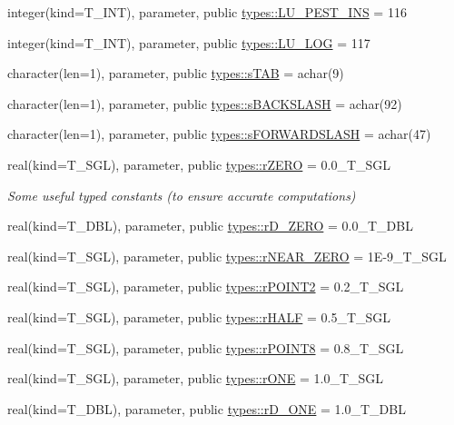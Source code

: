 \begin{DoxyCompactItemize}
\item 
integer(kind=T\_\-INT), parameter, public \hyperlink{namespacetypes_a8897682c60c1fbc7595e60937266dfc3}{types::LU\_\-PEST\_\-INS} = 116
\item 
integer(kind=T\_\-INT), parameter, public \hyperlink{namespacetypes_a6b30bc5adf5ad8e9498b0a9081078fe5}{types::LU\_\-LOG} = 117
\item 
character(len=1), parameter, public \hyperlink{namespacetypes_a1aba85f347398a7d96a17c88c664c7a1}{types::sTAB} = achar(9)
\item 
character(len=1), parameter, public \hyperlink{namespacetypes_a7ac07dde59c21f645da2f523cc34afe1}{types::sBACKSLASH} = achar(92)
\item 
character(len=1), parameter, public \hyperlink{namespacetypes_a75630efc0939bd3b2b2c5913d58c55f4}{types::sFORWARDSLASH} = achar(47)
\item 
real(kind=T\_\-SGL), parameter, public \hyperlink{namespacetypes_accfc31d1cd5f1a46b3fb99e6d1975a6b}{types::rZERO} = 0.0\_\-T\_\-SGL
\begin{DoxyCompactList}\small\item\em Some useful typed constants (to ensure accurate computations) \item\end{DoxyCompactList}\item 
real(kind=T\_\-DBL), parameter, public \hyperlink{namespacetypes_af4d6e7a6f7dfdf6df6fa94bcd6af757f}{types::rD\_\-ZERO} = 0.0\_\-T\_\-DBL
\item 
real(kind=T\_\-SGL), parameter, public \hyperlink{namespacetypes_a50c1fa61c229766c2a17cb7687703cdb}{types::rNEAR\_\-ZERO} = 1E-\/9\_\-T\_\-SGL
\item 
real(kind=T\_\-SGL), parameter, public \hyperlink{namespacetypes_af161d4f0ffc44961986c81a32a2c82a7}{types::rPOINT2} = 0.2\_\-T\_\-SGL
\item 
real(kind=T\_\-SGL), parameter, public \hyperlink{namespacetypes_a496f566e809e4eaac5c2d3b6138667d1}{types::rHALF} = 0.5\_\-T\_\-SGL
\item 
real(kind=T\_\-SGL), parameter, public \hyperlink{namespacetypes_a3d2ba56f06a1f0b74066c51ebcfe3454}{types::rPOINT8} = 0.8\_\-T\_\-SGL
\item 
real(kind=T\_\-SGL), parameter, public \hyperlink{namespacetypes_a94afcebb08a1e89087d5ffb5a7585b72}{types::rONE} = 1.0\_\-T\_\-SGL
\item 
real(kind=T\_\-DBL), parameter, public \hyperlink{namespacetypes_a90dcad5fbd0123e675aed418b5b421cf}{types::rD\_\-ONE} = 1.0\_\-T\_\-DBL

\end{DoxyCompactItemize}
